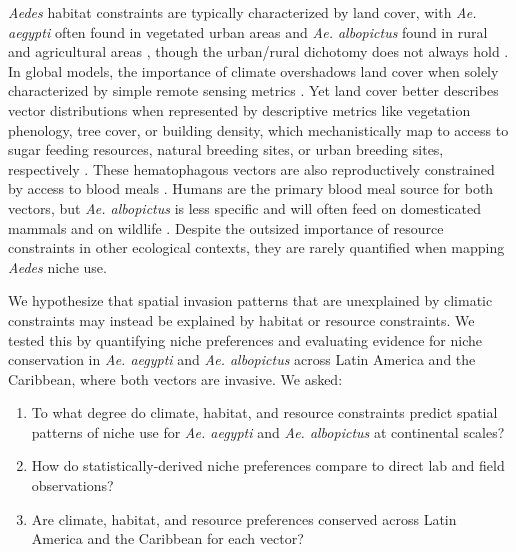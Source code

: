 \textit{Aedes} habitat constraints are typically characterized by land cover, with \textit{Ae. aegypti} often found in vegetated urban areas \cite{Troyo2009-yv, Jansen2010-uj} and \textit{Ae. albopictus} found in rural and agricultural areas \cite{Knudsen1995-pc, Tsuda2006-gl}, though the urban/rural dichotomy does not always hold \cite{Li2014-fq}. In global models, the importance of climate overshadows land cover when solely characterized by simple remote sensing metrics \cite{Kraemer2015-ct, Carlson2016-rc}. Yet land cover better describes vector distributions when represented by descriptive metrics like vegetation phenology, tree cover, or building density, which mechanistically map to access to sugar feeding resources, natural breeding sites, or urban breeding sites, respectively \cite{Martinez-Ibarra1997-ra, Peterson2005-ml, Vanwambeke2007-pw, Troyo2009-yv, Landau2012-dn, Li2014-fq}. These hematophagous vectors are also reproductively constrained by access to blood meals \cite{Padmanabha2012-xa}. Humans are the primary blood meal source for both vectors, but \textit{Ae. albopictus} is less specific and will often feed on domesticated mammals and on wildlife \cite{Gratz2004-xn, Delatte2008-hc}. Despite the outsized importance of resource constraints in other ecological contexts, they are rarely quantified when mapping \textit{Aedes} niche use.

We hypothesize that spatial invasion patterns that are unexplained by climatic constraints may instead be explained by habitat or resource constraints. We tested this by quantifying niche preferences and evaluating evidence for niche conservation in \textit{Ae. aegypti} and \textit{Ae. albopictus} across Latin America and the Caribbean, where both vectors are invasive. We asked:

\begin{enumerate}
    \item To what degree do climate, habitat, and resource constraints predict spatial patterns of niche use for \textit{Ae. aegypti} and \textit{Ae. albopictus} at continental scales? 
    \item How do statistically-derived niche preferences compare to direct lab and field observations?
    \item Are climate, habitat, and resource preferences conserved across Latin America and the Caribbean for each vector?
\end{enumerate}

